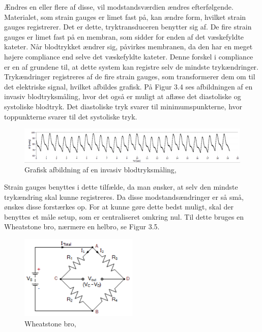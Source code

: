 Ændres en eller flere af disse, vil modstandsværdien ændres efterfølgende. Materialet, som strain gauges er limet fast på, kan ændre form, hvilket strain gauges registrerer. Det er dette, tryktransduceren benytter sig af. De fire strain gauges er limet fast på en membran, som sidder for enden af det væskefyldte kateter. Når blodtrykket ændrer sig, påvirkes membranen, da den har en meget højere compliance end selve det væskefyldte kateter. Denne forskel i compliance er en af grundene til, at dette system kan registre selv de mindste trykændringer. \\ 
Trykændringer registreres af de fire strain gauges, som transformerer dem om til det elektriske signal, hvilket afbildes grafisk. På Figur 3.4 ses afbildningen af en invasiv blodtryksmåling, hvor det også er muligt at aflæse det diastoliske og systoliske blodtryk.  Det diastoliske tryk svarer til minimumspunkterne, hvor toppunkterne svarer til det systoliske tryk.


\begin{figure}[H]
	\centering
	\includegraphics[width=1\textwidth]{Figurer/Snip20151213_84}
	\caption{Grafisk afbildning af en invasiv blodtryksmåling, \protect\cite[s. 34]{Hjertecyklus}}
\end{figure}

Strain gauges benyttes i dette tilfælde, da man ønsker, at selv den mindste trykændring skal kunne registreres. Da disse modstandsændringer er så små, ønskes disse forstærkes op. For at kunne gøre dette bedst muligt, skal der benyttes et måle setup, som er centraliseret omkring nul. Til dette bruges en Wheatstone bro, nærmere en helbro, se Figur 3.5. 

\begin{figure}[H]
	\centering
	\includegraphics[width=0.5\textwidth]{Figurer/Snip20151207_63}
	\caption{Wheatstone bro, \protect\cite{Wheatestone}}
\end{figure}

